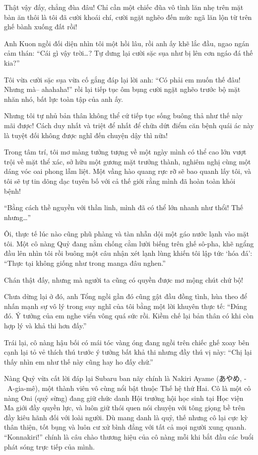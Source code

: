 \documentclass[../main.tex]{subfiles}
\begin{document}
Thật vậy đấy, chẳng đùa đâu! Chỉ cần một chiếc đũa vô tình lăn nhẹ trên mặt bàn ăn thôi là tôi đã cười khoái chí, cười ngặt nghẽo đến mức ngã lăn lộn từ trên ghế bành xuống đất rồi!

Anh Kuon ngồi đối diện nhìn tôi một hồi lâu, rồi anh ấy khẽ lắc đầu, ngao ngán cảm thán: ``Cái gì vậy trời\dots? Tự dưng lại cười sặc sụa như bị lên cơn ngáo đá thế kia?''

Tôi vừa cười sặc sụa vừa cố gắng đáp lại lời anh: ``Có phải em muốn thế đâu! Nhưng mà-- ahahaha!'' rồi lại tiếp tục ôm bụng cười ngặt nghẽo trước bộ mặt nhăn nhó, bất lực toàn tập của anh ấy.

Nhưng tôi tự nhủ bản thân không thể cứ tiếp tục sống buông thả như thế này mãi được! Cách duy nhất và triệt để nhất để chữa dứt điểm căn bệnh quái ác này là tuyệt đối không được nghĩ đến chuyện dậy thì nữa!

Trong tâm trí, tôi mơ màng tưởng tượng về một ngày mình có thể cao lớn vượt trội về mặt thể xác, sở hữu một gương mặt trưởng thành, nghiêm nghị cùng một dáng vóc oai phong lẫm liệt. Một vầng hào quang rực rỡ sẽ bao quanh lấy tôi, và tôi sẽ tự tin dõng dạc tuyên bố với cả thế giới rằng mình đã hoàn toàn khỏi bệnh!


``Bằng cách thề nguyền với thần linh, mình đã có thể lớn nhanh như thổi! Thế nhưng\dots''

Ôi, thực tế lúc nào cũng phũ phàng và tàn nhẫn dội một gáo nước lạnh vào mặt tôi. Một cô nàng Quỷ đang nằm chống cằm lười biếng trên ghế sô-pha, khẽ ngẩng đầu lên nhìn tôi rồi buông một câu nhận xét lạnh lùng khiến tôi lập tức `hóa đá': ``Thực tại không giống như trong manga đâu nghen.''

Chán thật đấy, nhưng mà người ta cũng có quyền được mơ mộng chút chứ bộ!

Chưa dừng lại ở đó, anh Tổng ngồi gần đó cũng gật đầu đồng tình, hùa theo để nhấn mạnh sự vô lý trong suy nghĩ của tôi bằng một lời khuyên thực tế: ``Đúng đó. Ý tưởng của em nghe viển vông quá sức rồi. Kiềm chế lại bản thân có khi còn hợp lý và khả thi hơn đấy.''

Trái lại, cô nàng hậu bối có mái tóc vàng óng đang ngồi trên chiếc ghế xoay bên cạnh lại tỏ vẻ thích thú trước ý tưởng bất khả thi nhưng đầy thú vị này: ``Chị lại thấy nhìn em như thế này cũng hay ho đấy chứ.''


\chrint

Nàng Quỷ vừa cất lời đáp lại Subaru ban nãy chính là Nakiri Ayame (あやめ, -\ A-gia-mê), một thành viên vô cùng nổi bật thuộc Thế hệ thứ Hai. Cô là một cô nàng Oni (quỷ sừng) đang giữ chức danh Hội trưởng hội học sinh tại Học viện Ma giới đầy quyền lực, và luôn giữ thói quen nói chuyện với tông giọng bề trên đầy kiêu hãnh đối với loài người. Dù mang danh là quỷ, thế nhưng cô lại cực kỳ thân thiện, tốt bụng và luôn cư xử bình đẳng với tất cả mọi người xung quanh. ``Konnakiri!'' chính là câu chào thương hiệu của cô nàng mỗi khi bắt đầu các buổi phát sóng trực tiếp của mình.
\end{document}
